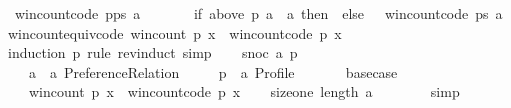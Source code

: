 \begin{isabellebody}
\ \ {\isachardoublequoteopen}win{\isacharunderscore}{\kern0pt}count{\isacharunderscore}{\kern0pt}code\ {\isacharparenleft}{\kern0pt}p{\isacharhash}{\kern0pt}ps{\isacharparenright}{\kern0pt}\ a\ {\isacharequal}{\kern0pt}\isanewline
\ \ \ \ \ \ {\isacharparenleft}{\kern0pt}if\ {\isacharparenleft}{\kern0pt}above\ p\ a\ {\isacharequal}{\kern0pt}\ {\isacharbraceleft}{\kern0pt}a{\isacharbraceright}{\kern0pt}{\isacharparenright}{\kern0pt}\ then\ {}\ else\ {}{\isacharparenright}{\kern0pt}\ {\isacharplus}{\kern0pt}\ win{\isacharunderscore}{\kern0pt}count{\isacharunderscore}{\kern0pt}code\ ps\ a{\isachardoublequoteclose}\isanewline
\isanewline
{}\isamarkupfalse%
\ win{\isacharunderscore}{\kern0pt}count{\isacharunderscore}{\kern0pt}equiv{\isacharbrackleft}{\kern0pt}code{\isacharbrackright}{\kern0pt}{\isacharcolon}{\kern0pt}\ {\isachardoublequoteopen}win{\isacharunderscore}{\kern0pt}count\ p\ x\ {\isacharequal}{\kern0pt}\ win{\isacharunderscore}{\kern0pt}count{\isacharunderscore}{\kern0pt}code\ p\ x{\isachardoublequoteclose}\isanewline
%
\isadelimproof
%
\endisadelimproof
%
\isatagproof
{}\isamarkupfalse%
\ {\isacharparenleft}{\kern0pt}induction\ p\ rule{\isacharcolon}{\kern0pt}\ rev{\isacharunderscore}{\kern0pt}induct{\isacharcomma}{\kern0pt}\ simp{\isacharparenright}{\kern0pt}\isanewline
\ \ \isamarkupfalse%
\ {\isacharparenleft}{\kern0pt}snoc\ a\ p{\isacharparenright}{\kern0pt}\isanewline
\ \ \isamarkupfalse%
\isanewline
\ \ \ \ a\ {\isacharcolon}{\kern0pt}{\isacharcolon}{\kern0pt}\ {\isachardoublequoteopen}{\isacharprime}{\kern0pt}a\ Preference{\isacharunderscore}{\kern0pt}Relation{\isachardoublequoteclose}\ \isanewline
\ \ \ \ p\ {\isacharcolon}{\kern0pt}{\isacharcolon}{\kern0pt}\ {\isachardoublequoteopen}{\isacharprime}{\kern0pt}a\ Profile{\isachardoublequoteclose}\isanewline
\ \ \isamarkupfalse%
\isanewline
\ \ \ \ base{\isacharunderscore}{\kern0pt}case{\isacharcolon}{\kern0pt}\isanewline
\ \ \ \ {\isachardoublequoteopen}win{\isacharunderscore}{\kern0pt}count\ p\ x\ {\isacharequal}{\kern0pt}\ win{\isacharunderscore}{\kern0pt}count{\isacharunderscore}{\kern0pt}code\ p\ x{\isachardoublequoteclose}\isanewline
\ \ \isamarkupfalse%
\ size{\isacharunderscore}{\kern0pt}one{\isacharcolon}{\kern0pt}\ {\isachardoublequoteopen}length\ {\isacharbrackleft}{\kern0pt}a{\isacharbrackright}{\kern0pt}\ {\isacharequal}{\kern0pt}\ {}{\isachardoublequoteclose}\isanewline
\ \ \ \ \isamarkupfalse%
\ simp\isanewline
\ \ \isamarkupfalse%

\end{isabellebody}
